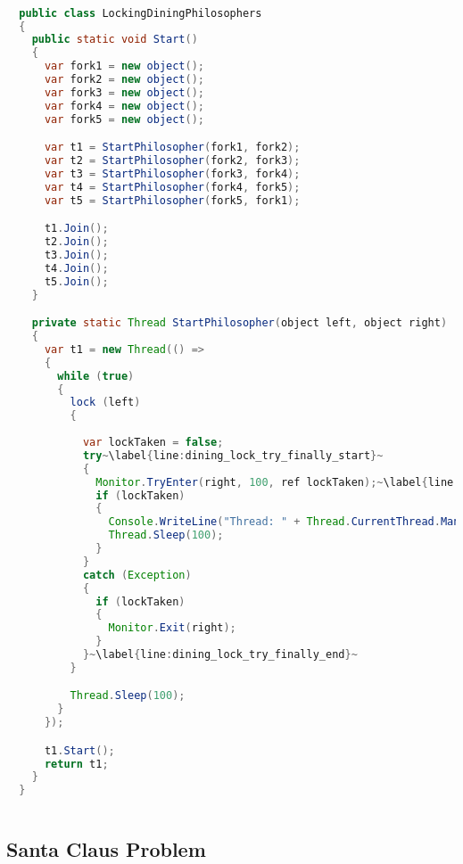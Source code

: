 \begin{lstlisting}[label=lst:impl_dining_lock,
  caption={Lock based dining philosophers implementation},
  language=Java,  
  showspaces=false,
  showtabs=false,
  breaklines=true,
  showstringspaces=false,
  breakatwhitespace=true,
  commentstyle=\color{greencomments},
  keywordstyle=\color{bluekeywords},
  stringstyle=\color{redstrings},
  escapechar=~,
  morekeywords={atomic, retry, orelse, var, get, set, ref, out, readonly, virtual, override}]  % Start your code-block

  public class LockingDiningPhilosophers
  {
  	public static void Start()
  	{
      var fork1 = new object();
      var fork2 = new object();
      var fork3 = new object();
      var fork4 = new object();
      var fork5 = new object();

      var t1 = StartPhilosopher(fork1, fork2);
      var t2 = StartPhilosopher(fork2, fork3);
      var t3 = StartPhilosopher(fork3, fork4);
      var t4 = StartPhilosopher(fork4, fork5);
      var t5 = StartPhilosopher(fork5, fork1);

      t1.Join();
      t2.Join();
      t3.Join();
      t4.Join();
      t5.Join();
    }

    private static Thread StartPhilosopher(object left, object right)
    {
      var t1 = new Thread(() =>
      {
        while (true)
        {
          lock (left)
          {
          
            var lockTaken = false;
            try~\label{line:dining_lock_try_finally_start}~
            {
              Monitor.TryEnter(right, 100, ref lockTaken);~\label{line:dining_lock_try}~
              if (lockTaken)
              {
                Console.WriteLine("Thread: " + Thread.CurrentThread.ManagedThreadId + " eating.");
                Thread.Sleep(100);
              }
            }
            catch (Exception)
            {
              if (lockTaken)
              {
                Monitor.Exit(right);
              }
            }~\label{line:dining_lock_try_finally_end}~
          }

          Thread.Sleep(100);
        }
      });

      t1.Start();
      return t1;
    }
  }
  
\end{lstlisting}

\subsection{Santa Claus Problem}

